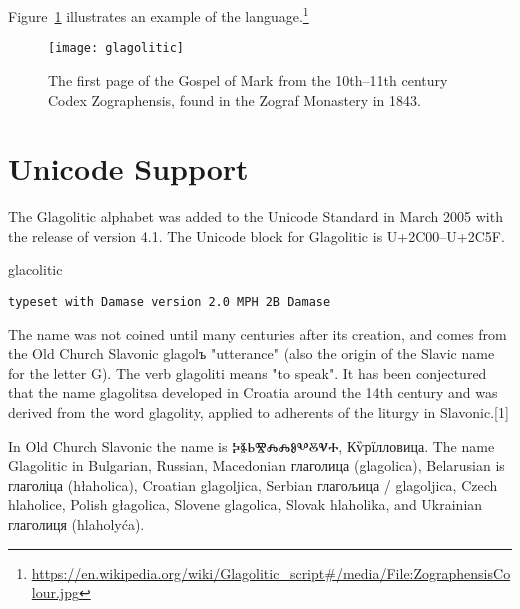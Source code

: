 Figure~\ref{fig:zograf} illustrates an example of the language.\footnote{\url{https://en.wikipedia.org/wiki/Glagolitic_script\#/media/File:ZographensisColour.jpg}}

\begin{figure}[htbp]
\centering

\texttt{[image: glagolitic]}
\caption[The first page of the Gospel of Mark from the 10th–11th century Codex Zographensis, found in the Zograf Monastery in 1843.]{The first page of the Gospel of Mark from the 10th–11th century Codex Zographensis, found in the Zograf Monastery in 1843.}
\label{fig:zograf}
\end{figure}

\section{Unicode Support}
The Glagolitic alphabet was added to the Unicode Standard in March 2005 with the release of version 4.1.
The Unicode block for Glagolitic is U+2C00–U+2C5F.



\begin{scriptexample}[]{glacolitic}


\texttt{typeset with Damase version 2.0 MPH 2B Damase}
\end{scriptexample}
\bgroup
\glagolitic

The name was not coined until many centuries after its creation, and comes from the Old Church Slavonic glagolъ "utterance" (also the origin of the Slavic name for the letter G). The verb glagoliti means "to speak". It has been conjectured that the name glagolitsa developed in Croatia around the 14th century and was derived from the word glagolity, applied to adherents of the liturgy in Slavonic.[1]

In Old Church Slavonic the name is {\glagolitic ⰍⰫⰓⰊⰎⰎⰑⰂⰋⰜⰀ}, Кѷрїлловица.
The name Glagolitic in Bulgarian, Russian, Macedonian глаголица (glagolica), Belarusian is глаголіца (hłaholica), Croatian glagoljica, Serbian глагољица / glagoljica, Czech hlaholice, Polish głagolica, Slovene glagolica, Slovak hlaholika, and Ukrainian глаголиця (hlaholyća).



\egroup